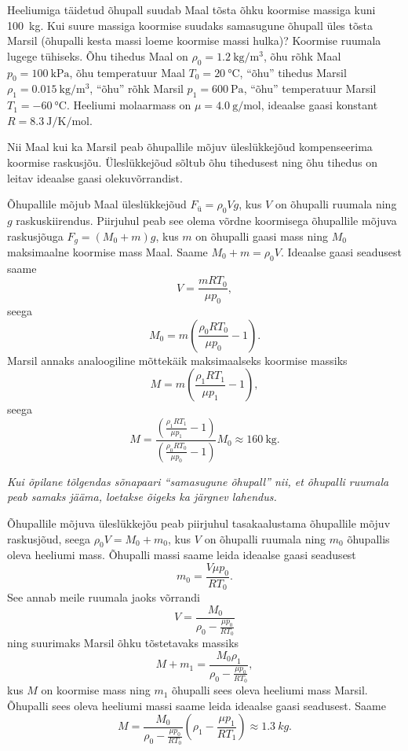 
Heeliumiga täidetud õhupall suudab Maal tõsta õhku koormise massiga kuni
\SI{100}{\kilogram}. Kui suure massiga koormise suudaks samasugune õhupall
üles tõsta Marsil (õhupalli kesta massi loeme koormise massi hulka)? 
Koormise ruumala lugege tühiseks. Õhu tihedus Maal on
$\rho_0=\SI{1.2}{\kilogram\per\meter^3}$, õhu rõhk Maal
$p_0=\SI{100}{\kilo\pascal}$, õhu temperatuur Maal $T_0=\SI{20}{\degreeCelsius}$,
\enquote{õhu} tihedus Marsil $\rho_1=\SI{0.015}{\kilogram\per\meter^3}$, \enquote{õhu} rõhk Marsil
$p_1=\SI{600}{\pascal}$, \enquote{õhu} temperatuur Marsil $T_1=\SI{-60}{\degreeCelsius}$.
Heeliumi molaarmass on $\mu=\SI{4.0}{\gram\per\mole}$, ideaalse gaasi konstant
$R=\SI{8.3}{\joule\per\kelvin\per\mole}$.

\hint
Nii Maal kui ka Marsil peab õhupallile mõjuv üleslükkejõud kompenseerima koormise raskusjõu. Üleslükkejõud sõltub õhu tihedusest ning õhu tihedus on leitav ideaalse gaasi olekuvõrrandist.

\solu
Õhupallile mõjub Maal üleslükkejõud $F_{ü}=\rho_0Vg$, kus $V$ on õhupalli ruumala ning $g$ raskuskiirendus. Piirjuhul peab see olema võrdne koormisega õhupallile mõjuva raskusjõuga $F_g=(M_0+m)g$, kus $m$ on õhupalli gaasi mass ning $M_0$ maksimaalne koormise mass Maal. Saame $M_0+m=\rho_0V$. Ideaalse gaasi seadusest saame
\[
V=\frac{mRT_0}{\mu p_0},
\]
seega 
\[
M_0=m\left(\frac{\rho_0 RT_0}{\mu p_0}-1\right).
\]
Marsil annaks analoogiline mõttekäik maksimaalseks koormise massiks
\[
M=m(\frac{\rho_1RT_1}{\mu p_1}-1),
\]
seega
\[M=\frac{\left(\frac{\rho_1RT_1}{\mu p_1}-1\right)}{(\frac{\rho_0RT_0}{\mu p_0}-1)}M_0\approx \SI{160}{\kilogram}.
\]

{\em Kui õpilane tõlgendas sõnapaari ``samasugune õhupall'' nii, et õhupalli ruumala peab samaks jääma, loetakse õigeks ka järgnev lahendus.}

Õhupallile mõjuva üleslükkejõu peab piirjuhul tasakaalustama õhupallile mõjuv raskusjõud, seega $\rho_0 V=M_0+m_0$, kus $V$ on õhupalli ruumala ning $m_0$ õhupallis oleva heeliumi mass. Õhupalli massi saame leida ideaalse gaasi seadusest
\[
m_0=\frac{V\mu p_0}{RT_0}.
\]
See annab meile ruumala jaoks võrrandi
\[
V=\frac{M_0}{\rho_0-\frac{\mu p_0}{RT_0}}
\]
ning suurimaks Marsil õhku tõstetavaks massiks
\[
M+m_1=\frac{M_0\rho_1}{\rho_0-\frac{\mu p_0}{RT_0}},
\]
kus $M$ on koormise mass ning $m_1$ õhupalli sees oleva heeliumi mass Marsil. Õhupalli sees oleva heeliumi massi saame leida ideaalse gaasi seadusest. Saame
\[
M=\frac{M_0}{\rho_0-\frac{\mu p_0}{RT_0}}\left(\rho_1-\frac{\mu p_1}{RT_1}\right)\approx \SI{1,3}{kg}.
\]

